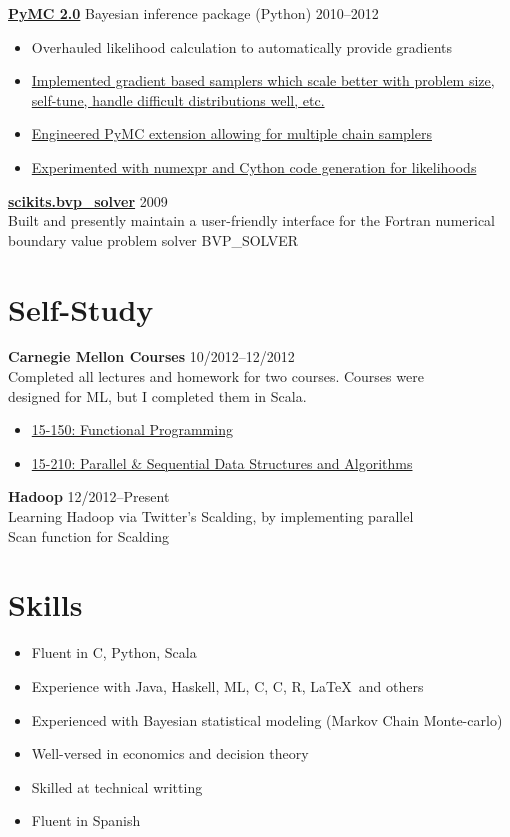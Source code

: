 \documentclass[margin]{res}
\newcommand{\bitem}{\begin{samepage}\begin{itemize} \itemsep -2pt}
\newcommand{\eitem}{\end{itemize}\end{samepage} }
\newcommand{\hrowbase}[3]{
  {\bf #1} #2 \hfill #3
}
\newcommand{\headrow}[3]{
  \hrowbase{#1}{#2}{#3}
    \vspace{6pt}
    \bitem
      }
\newcommand{\eheadrow}[0]{\eitem}
\newcommand{\headrowdesc}[3]{
  \hrowbase{#1}{}{#2} \ \\
    #3
    \vspace{6pt}
      }
\newcommand{\CPP}
{C\nolinebreak[4]\hspace{-.05em}\raisebox{.22ex}{\footnotesize\bf ++}}
\newcommand{\CS}
{C\nolinebreak[4]\hspace{-.05em}\raisebox{.22ex}{\footnotesize\#}}
\begin{document}
\begin{resume}
    \headrow{\href{https://github.com/pymc-devs/pymc\#readme}{PyMC 2.0}}{Bayesian inference package (Python)}{2010--2012}
      \item Overhauled likelihood calculation to automatically provide gradients 
      \item \href{https://github.com/jsalvatier/gradient\_samplers/blob/master/gradient\_samplers}{Implemented gradient based samplers which scale better with problem size, self-tune, handle difficult distributions well, etc.}
      \item \href{http://pypi.python.org/pypi/multichain\_mcmc}{Engineered PyMC extension allowing for multiple chain samplers}
      \item \href{https://github.com/pymc-devs/pymc/commits/numexpr\_dist}{Experimented with numexpr and Cython code generation for likelihoods}
    \eheadrow

    \headrowdesc{\href{packages.python.org/scikits.bvp\_solver}{scikits.bvp\_solver}}{2009}{
      Built and presently maintain a user-friendly interface for the Fortran numerical \\
    boundary value problem solver BVP\_SOLVER}

\section{Self-Study}
    \headrowdesc{Carnegie Mellon Courses}{10/2012--12/2012}{Completed all lectures and homework for two courses. Courses were \\
    designed for ML, but I completed them in Scala.} 
    \bitem
\item \href{http://www.cs.cmu.edu/~15150/previous-semesters/2012-spring/}{15-150: Functional Programming}
      \item \href{http://www.cs.cmu.edu/~15210/index.html}{15-210: Parallel \& Sequential Data Structures and Algorithms}
    \eitem
    \headrowdesc{Hadoop}{12/2012--Present}{Learning Hadoop via Twitter's Scalding, by implementing parallel \\
      Scan function for Scalding}

\section{Skills}
    \bitem
      \item Fluent in \CS, Python, Scala
      \item Experience with Java, Haskell, ML, C, \CPP, R, \LaTeX\ and others
      \item Experienced with Bayesian statistical modeling (Markov Chain Monte-carlo)
      \item Well-versed in economics and decision theory
      \item Skilled at technical writting
      \item Fluent in Spanish 
    \eitem


\end{resume}
\end{document}
